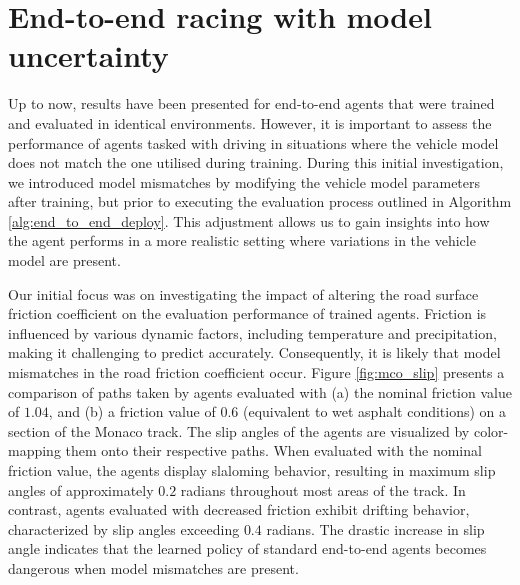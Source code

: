 
\section{End-to-end racing with model uncertainty}


Up to now, results have been presented for end-to-end agents that were trained and evaluated in identical environments. 
However, it is important to assess the performance of agents tasked with driving in situations where the vehicle model does not match the one utilised during training.
During this initial investigation, we introduced model mismatches by modifying the vehicle model parameters after training, but prior to executing the evaluation process outlined in Algorithm \ref{alg:end_to_end_deploy}. 
This adjustment allows us to gain insights into how the agent performs in a more realistic setting where variations in the vehicle model are present.


Our initial focus was on investigating the impact of altering the road surface friction coefficient on the evaluation performance of trained agents.
Friction is influenced by various dynamic factors, including temperature and precipitation, making it challenging to predict accurately.
Consequently, it is likely that model mismatches in the road friction coefficient occur.
Figure \ref{fig:mco_slip} presents a comparison of paths taken by agents evaluated with (a) the nominal friction value of $1.04$, and (b) a friction value of $0.6$ (equivalent to wet asphalt conditions) on a section of the Monaco track. 
The slip angles of the agents are visualized by color-mapping them onto their respective paths. 
When evaluated with the nominal friction value, the agents display slaloming behavior, resulting in maximum slip angles of approximately $0.2$ radians throughout most areas of the track. 
In contrast, agents evaluated with decreased friction exhibit drifting behavior, characterized by slip angles exceeding $0.4$ radians. 
The drastic increase in slip angle indicates that the learned policy of standard end-to-end agents becomes dangerous when model mismatches are present.

